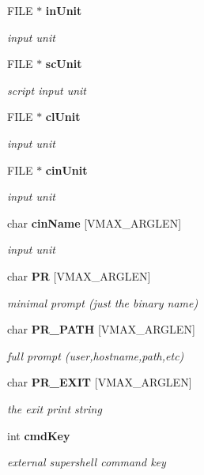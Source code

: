 \begin{DoxyCompactItemize}
FILE $\ast$ {\bf inUnit}
\begin{DoxyCompactList}\small\item\em input unit \item\end{DoxyCompactList}\item 
FILE $\ast$ {\bf scUnit}
\begin{DoxyCompactList}\small\item\em script input unit \item\end{DoxyCompactList}\item 
FILE $\ast$ {\bf clUnit}
\begin{DoxyCompactList}\small\item\em input unit \item\end{DoxyCompactList}\item 
FILE $\ast$ {\bf cinUnit}
\begin{DoxyCompactList}\small\item\em input unit \item\end{DoxyCompactList}\item 
char {\bf cinName} [VMAX\_\-ARGLEN]
\begin{DoxyCompactList}\small\item\em input unit \item\end{DoxyCompactList}\item 
char {\bf PR} [VMAX\_\-ARGLEN]
\begin{DoxyCompactList}\small\item\em minimal prompt (just the binary name) \item\end{DoxyCompactList}\item 
char {\bf PR\_\-PATH} [VMAX\_\-ARGLEN]
\begin{DoxyCompactList}\small\item\em full prompt (user,hostname,path,etc) \item\end{DoxyCompactList}\item 
char {\bf PR\_\-EXIT} [VMAX\_\-ARGLEN]
\begin{DoxyCompactList}\small\item\em the exit print string \item\end{DoxyCompactList}\item 
int {\bf cmdKey}
\begin{DoxyCompactList}\small\item\em external supershell command key \item\end{DoxyCompactList}\item 

\end{DoxyCompactItemize}
